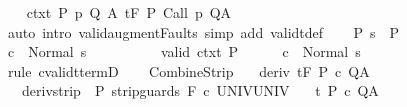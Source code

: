 \begin{isabellebody}
\ \ \isamarkupfalse%
\ ctxt{\isacharprime}{\isacharcolon}\ {\isachardoublequoteopen}{\isasymforall}{\isacharparenleft}P{\isacharcomma}\ p{\isacharcomma}\ Q{\isacharcomma}\ A{\isacharparenright}{\isasymin}{\isasymTheta}{\isachardot}\ {\isasymGamma}{\isasymTurnstile}\isactrlsub t\isactrlbsub {\isacharslash}F\isactrlesub \ P\ {\isacharparenleft}Call\ p{\isacharparenright}\ Q{\isacharcomma}A{\isachardoublequoteclose}\ \isanewline
\ \ \ \ \isamarkupfalse%
\ {\isacharparenleft}auto\ intro{\isacharcolon}\ valid{\isacharunderscore}augment{\isacharunderscore}Faults\ simp\ add{\isacharcolon}\ validt{\isacharunderscore}def{\isacharparenright}\isanewline
\ \ \isamarkupfalse%
\ P{\isacharcolon}\ {\isachardoublequoteopen}s\ {\isasymin}\ P{\isachardoublequoteclose}\isanewline
\ \ \isamarkupfalse%
\ {\isachardoublequoteopen}{\isasymGamma}{\isasymturnstile}c\ {\isasymdown}\ Normal\ s{\isachardoublequoteclose}\isanewline
\ \ \isamarkupfalse%
\ {\isacharminus}\isanewline
\ \ \ \ \isamarkupfalse%
\ valid\ ctxt{\isacharprime}\ P\isanewline
\ \ \ \ \isamarkupfalse%
\ {\isachardoublequoteopen}{\isasymGamma}{\isasymturnstile}c\ {\isasymdown}\ Normal\ s{\isachardoublequoteclose}\isanewline
\ \ \ \ \ \ \isamarkupfalse%
\ {\isacharparenleft}rule\ cvalidt{\isacharunderscore}termD{\isacharparenright}\isanewline
\ \ \isamarkupfalse%
\isanewline
{}\isamarkupfalse%
%
\endisatagproof
{\isafoldproof}%
%
\isadelimproof
\isanewline
%
\endisadelimproof
\isanewline
{}\isamarkupfalse%
\ CombineStrip{\isacharcolon}\isanewline
\ \ \ deriv{\isacharcolon}\ {\isachardoublequoteopen}{\isasymGamma}{\isacharcomma}{\isasymTheta}{\isasymturnstile}\isactrlsub t\isactrlbsub {\isacharslash}F\isactrlesub \ P\ c\ Q{\isacharcomma}A{\isachardoublequoteclose}\isanewline
\ \ \ deriv{\isacharunderscore}strip{\isacharcolon}\ {\isachardoublequoteopen}{\isasymGamma}{\isacharcomma}{\isasymTheta}{\isasymturnstile}\isactrlbsub {\isacharslash}{\isacharbraceleft}{\isacharbraceright}\isactrlesub \ P\ {\isacharparenleft}strip{\isacharunderscore}guards\ {\isacharparenleft}{\isacharminus}F{\isacharparenright}\ c{\isacharparenright}\ UNIV{\isacharcomma}UNIV{\isachardoublequoteclose}\isanewline
\ \ \ {\isachardoublequoteopen}{\isasymGamma}{\isacharcomma}{\isasymTheta}{\isasymturnstile}\isactrlsub t\isactrlbsub {\isacharslash}{\isacharbraceleft}{\isacharbraceright}\isactrlesub \ P\ c\ Q{\isacharcomma}A{\isachardoublequoteclose}\isanewline

\end{isabellebody}
